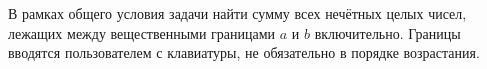 
\begin{zztask}
В рамках общего условия задачи найти сумму всех нечётных целых чисел,
лежащих между вещественными границами $a$ и $b$ включительно. Границы вводятся
пользователем с клавиатуры, не обязательно в порядке возрастания.
\end{zztask}


